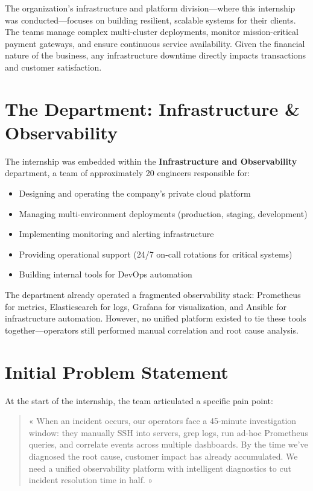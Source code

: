 \documentclass[12pt,a4paper]{report}
\begin{document}
The organization's infrastructure and platform division—where this internship was conducted—focuses on building resilient, scalable systems for their clients. The teams manage complex multi-cluster deployments, monitor mission-critical payment gateways, and ensure continuous service availability. Given the financial nature of the business, any infrastructure downtime directly impacts transactions and customer satisfaction.

\section{The Department: Infrastructure \& Observability}

The internship was embedded within the \textbf{Infrastructure and Observability} department, a team of approximately 20 engineers responsible for:

\begin{itemize}
  \item Designing and operating the company's private cloud platform
  \item Managing multi-environment deployments (production, staging, development)
  \item Implementing monitoring and alerting infrastructure
  \item Providing operational support (24/7 on-call rotations for critical systems)
  \item Building internal tools for DevOps automation
\end{itemize}

The department already operated a fragmented observability stack: Prometheus for metrics, Elasticsearch for logs, Grafana for visualization, and Ansible for infrastructure automation. However, no unified platform existed to tie these tools together—operators still performed manual correlation and root cause analysis.

\section{Initial Problem Statement}

At the start of the internship, the team articulated a specific pain point:

\begin{quote}
  « When an incident occurs, our operators face a 45-minute investigation window: they manually SSH into servers, grep logs, run ad-hoc Prometheus queries, and correlate events across multiple dashboards. By the time we've diagnosed the root cause, customer impact has already accumulated. We need a unified observability platform with intelligent diagnostics to cut incident resolution time in half. »
\end{quote}
\end{document}
